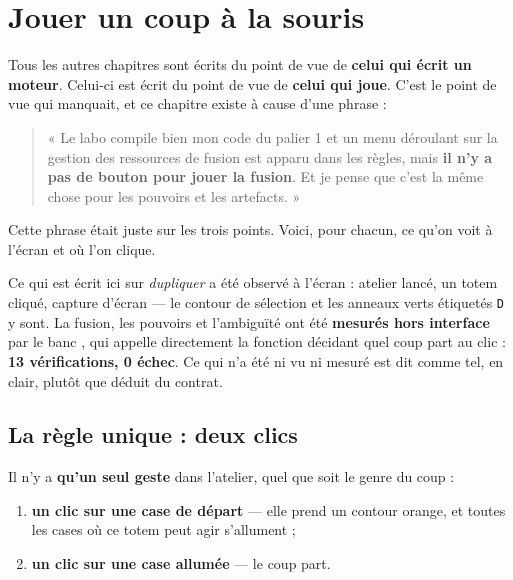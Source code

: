 \chapter{Jouer un coup à la souris}

Tous les autres chapitres sont écrits du point de vue de \textbf{celui qui écrit
un moteur}. Celui-ci est écrit du point de vue de \textbf{celui qui joue}. C'est
le point de vue qui manquait, et ce chapitre existe à cause d'une phrase :

\begin{quote}
« Le labo compile bien mon code du palier 1 et un menu déroulant sur la gestion
des ressources de fusion est apparu dans les règles, mais \textbf{il n'y a pas de
bouton pour jouer la fusion}. Et je pense que c'est la même chose pour les
pouvoirs et les artefacts. »
\end{quote}

Cette phrase était juste sur les trois points. Voici, pour chacun, ce qu'on voit
à l'écran et où l'on clique.

\begin{nkretenir}
Ce qui est écrit ici sur \emph{dupliquer} a été observé à l'écran : atelier
lancé, un totem cliqué, capture d'écran --- le contour de sélection et les
anneaux verts étiquetés \texttt{D} y sont. La fusion, les pouvoirs et
l'ambiguïté ont été \textbf{mesurés hors interface} par le banc
, qui appelle directement
la fonction décidant quel coup part au clic : \textbf{13 vérifications, 0
échec}. Ce qui n'a été ni vu ni mesuré est dit comme tel, en clair, plutôt que
déduit du contrat.
\end{nkretenir}

\section{La règle unique : deux clics}

Il n'y a \textbf{qu'un seul geste} dans l'atelier, quel que soit le genre du
coup :

\begin{enumerate}
  \item \textbf{un clic sur une case de départ} --- elle prend un contour
        orange, et toutes les cases où ce totem peut agir s'allument ;
  \item \textbf{un clic sur une case allumée} --- le coup part.
\end{enumerate}


